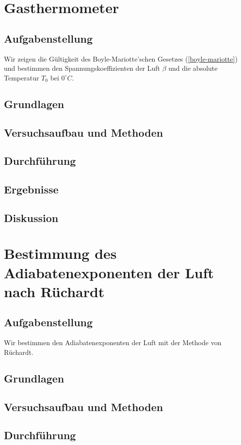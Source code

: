 \documentclass{article}
\begin{document}
\section{Gasthermometer}
\subsection{Aufgabenstellung}
Wir zeigen die Gültigkeit des Boyle-Mariotte'schen Gesetzes (\ref{boyle-mariotte}) und bestimmen den Spannungskoeffizienten der Luft $\beta$ und die absolute Temperatur $T_0$ bei $0^\circ C$.
\subsection{Grundlagen}
\subsection{Versuchsaufbau und Methoden}
\subsection{Durchführung}
\subsection{Ergebnisse}
\subsection{Diskussion}

\newpage
\section{Bestimmung des Adiabatenexponenten der Luft nach Rüchardt}
\subsection{Aufgabenstellung}
Wir bestimmen den Adiabatenexponenten der Luft mit der Methode von Rüchardt.
\subsection{Grundlagen}
\subsection{Versuchsaufbau und Methoden}
\subsection{Durchführung}
\end{document}
